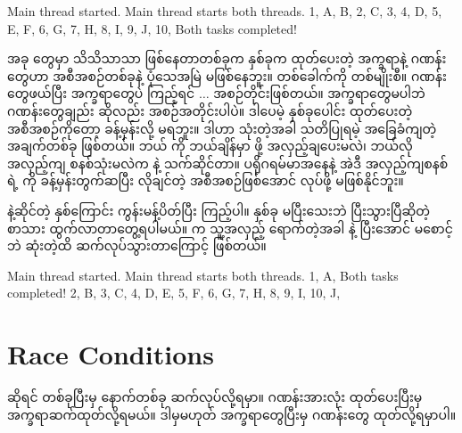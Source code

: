 %
\begin{vbtm}
Main thread started.
Main thread starts both threads.
1, A, B, 2, C, 3, 4, D, 5, E, F, 6, G, 7, H, 8, I, 9, J, 10, 
Both tasks completed!
\end{vbtm}
%

အခု  တွေမှာ သိသိသာသာ ဖြစ်နေတာတစ်ခုက  နှစ်ခုက ထုတ်ပေးတဲ့ အက္ခရာနဲ့ ဂဏန်းတွေဟာ  အစီအစဉ်တစ်ခုနဲ့ ပုံသေအမြဲ မဖြစ်နေဘူး။ တစ်ခေါက်ကို တစ်မျိုးစီ။ ဂဏန်းတွေဖယ်ပြီး အက္ခရာတွေပဲ ကြည့်ရင်  $\ldots$ အစဉ်တိုင်းဖြစ်တယ်။ အက္ခရာတွေမပါဘဲ ဂဏန်းတွေချည်း ဆိုလည်း အစဉ်အတိုင်းပါပဲ။ ဒါပေမဲ့  နှစ်ခုပေါင်း ထုတ်ပေးတဲ့  အစီအစဉ်ကိုတော့ ခန့်မှန်းလို့ မရဘူး။ ဒါဟာ  သုံးတဲ့အခါ သတိပြုရမဲ့ အခြေခံကျတဲ့ အချက်တစ်ခု ဖြစ်တယ်။ ဘယ်  ကို ဘယ်ချိန်မှာ  ဖို့ အလှည့်ချပေးမလဲ၊ ဘယ်လို အလှည့်ကျ စနစ်သုံးမလဲက  နဲ့ သက်ဆိုင်တာ။ ပရိုဂရမ်မာအနေနဲ့ အဲဒီ  အလှည့်ကျစနစ်ရဲ့  ကို ခန့်မှန်းတွက်ဆပြီး လိုချင်တဲ့ အစီအစဉ်ဖြစ်အောင် လုပ်ဖို့ မဖြစ်နိုင်ဘူး။

 နဲ့ဆိုင်တဲ့ နှစ်ကြောင်း ကွန်းမန့်ပိတ်ပြီး  ကြည့်ပါ။  နှစ်ခု မပြီးသေးဘဲ ပြီးသွားပြီဆိုတဲ့စာသား ထွက်လာတာတွေ့ရပါမယ်။  က သူ့အလှည့် ရောက်တဲ့အခါ  နဲ့  ပြီးအောင် မစောင့်ဘဲ ဆုံးတဲ့ထိ ဆက်လုပ်သွားတာကြောင့် ဖြစ်တယ်။


%
\begin{vbtm}
Main thread started.
Main thread starts both threads.
1, A, 
Both tasks completed!
2, B, 3, C, 4, D, E, 5, F, 6, G, 7, H, 8, 9, I, 10, J,
\end{vbtm}
%

\section{Race Conditions}

\clearpage






\clearpage {} ဆိုရင် တစ်ခုပြီးမှ နောက်တစ်ခု ဆက်လုပ်လို့ရမှာ။ ဂဏန်းအားလုံး ထုတ်ပေးပြီးမှ အက္ခရာဆက်ထုတ်လို့ရမယ်။ ဒါမှမဟုတ် အက္ခရာတွေပြီးမှ ဂဏန်းတွေ ထုတ်လို့ရမှာပါ။  \fEn{}


